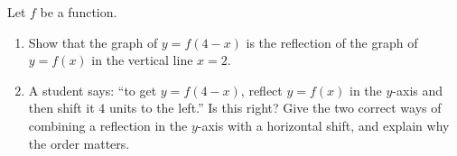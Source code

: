 Let $f$ be a function.
\begin{enumerate}
\item[(a)] Show that the graph of $y=f(4-x)$ is the reflection of the graph of $y=f(x)$ in the vertical line $x=2$.
\item[(b)] A student says: ``to get $y=f(4-x)$, reflect $y=f(x)$ in the $y$-axis and then shift it $4$ units to the left.'' Is this right? Give the two correct ways of combining a reflection in the $y$-axis with a horizontal shift, and explain why the order matters.
\end{enumerate}
